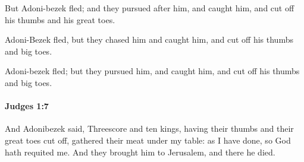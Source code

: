 			\begin{versebox}
					\item[BHS] 
					\item[ASV] But Adoni-bezek fled; and they pursued after him, and caught him, and cut off his thumbs and his great toes.
					\item[NIV] Adoni-Bezek fled, but they chased him and caught him, and cut off his thumbs and big toes.
					\item[NRSV] Adoni-bezek fled; but they pursued him, and caught him, and cut off his thumbs and big toes.
			\end{versebox}

		\paragraph{Judges 1:7} %
			\label{JUDGES-1-7}

			And Adonibezek said, Threescore and ten kings, having their thumbs and their great toes cut off, gathered their meat under my table: as I have done, so God hath requited me. And they brought him to Jerusalem, and there he died.

